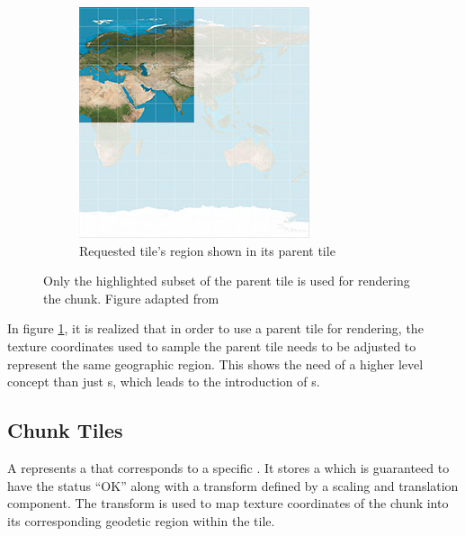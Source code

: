 \begin{figure}[htbp]
\begin{subfigure}[t]{0.3\textwidth}
        \includegraphics[width=\textwidth]{figures/implementation/chunktile/chunktile2.jpg}
        \caption{Requested tile's region shown in its parent tile}
    \end{subfigure}
    \caption{Only the highlighted subset of the parent tile is used for rendering the chunk. Figure adapted from \cite{mapprojections}}
    \label{fig:tiles}
\end{figure}

In figure \ref{fig:tiles}, it is realized that in order to use a parent tile for rendering, the texture coordinates used to sample the parent tile needs to be adjusted to represent the same geographic region. This shows the need of a higher level concept than just s, which leads to the introduction of s.

\subsection{Chunk Tiles}
  
A  represents a  that corresponds to a specific . It stores a  which is guaranteed to have the status ``OK'' along with a transform defined by a scaling and translation component. The transform is used to map texture coordinates of the chunk into its corresponding geodetic region within the tile. 

